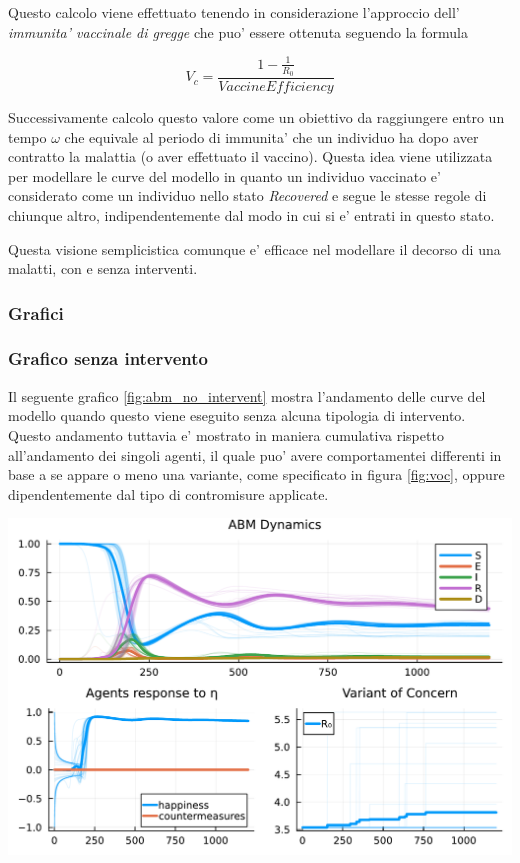 Questo calcolo viene effettuato tenendo in considerazione l'approccio dell' \emph{immunita' vaccinale di gregge} che puo'
essere ottenuta seguendo la formula 

$$V_c = \frac{1-\frac{1}{R_0}}{VaccineEfficiency}$$

Successivamente calcolo questo valore come un obiettivo da raggiungere entro un tempo $\omega$ che equivale al 
periodo di immunita' che un individuo ha dopo aver contratto la malattia (o aver effettuato il vaccino). 
Questa idea viene utilizzata per modellare le curve del modello in quanto un individuo vaccinato e' considerato 
come un individuo nello stato \emph{Recovered} e segue le stesse regole di chiunque altro, indipendentemente
dal modo in cui si e' entrati in questo stato. 

Questa visione semplicistica comunque e' efficace nel modellare il decorso di una malatti, con e senza interventi.

\subsubsection{Grafici}

\subsubsection*{Grafico senza intervento}
Il seguente grafico \ref{fig:abm_no_intervent} mostra l'andamento delle curve del modello
quando questo viene eseguito senza alcuna tipologia di intervento. Questo andamento tuttavia e' mostrato 
in maniera cumulativa rispetto all'andamento dei singoli agenti, il quale puo' avere comportamentei 
differenti in base a se appare o meno una variante, come specificato in figura \ref{fig:voc}, oppure 
dipendentemente dal tipo di contromisure applicate. 

\begin{minipage}{\linewidth}
	\centering
	\includegraphics[width=\textwidth]{img/SocialNetworkABM_NO_CONTROL_2023-07-15.pdf}
	\label{fig:abm_no_intervent}
\end{minipage}

